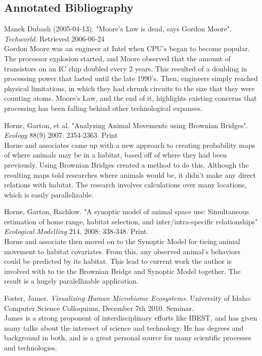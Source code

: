 \pagebreak


\subsection{Annotated Bibliography}
\begin{thebibliography}{99}
 Manek Dubash (2005-04-13). "Moore's Law is dead, says
        Gordon Moore". {\em Techworld}. Retrieved 2006-06-24
	\\
Gordon Moore was an engineer at Intel when CPU's began to become popular. The
processor explosion started, and Moore observed that the amount of transistors
on an IC chip doubled every 2 years. This resulted of a doubling in processing
power that lasted until the late 1990's. Then, engineers simply reached 
physical limitations, in which they had shrunk circuits to the size that they
were counting atoms. Moore's Law, and the end of it, highlights existing 
concerns that processing has been falling behind other technological expanses.

 Horne, Garton, et al. "Analyzing Animal Movements using Brownian
        Bridges". { \em Ecology } 88(9) 2007: 2354-2363. Print
	\\
Horne and associates came up with a new approach to creating probability maps
of where animals may be in a habitat, based off of where they had been 
previously. Using Brownian Bridges created a method to do this. Although the 
resulting maps told researches where animals would be, it didn't make any 
direct relations with habitat. The research involves calculations over many locations, which is easily parallelizable.

 Horne, Garton, Rachlow. "A synoptic model of animal space use:
        Simultaneous estimation of home range, habitat selection, and
        inter/intra-speciﬁc relationships" {\em Ecological Modelling}
        214, 2008: 338-348. Print.
	\\
Horne and associate then moved on to the Synoptic Model for tieing animal 
movement to habitat covariates. From this, any observed animal's behaviors 
could be predicted by its habitat. This lead to current work the author is 
involved with to tie the Brownian Bridge and Synoptic Model together. The
result is a hugely paralellizable application.

 Foster, James. {\em Visualizing Human Microbiome
	Ecosystems}. University of Idaho: Computer Science Colloquium, 
	December 7th 2010. Seminar.
	\\
James is a strong proponent of interdisciplinary efforts like IBEST, and has
given many talks about the intersect of science and technology. He has degrees
and background in both, and is a great personal source for many scientific
processes and technologies.

\end{thebibliography}


